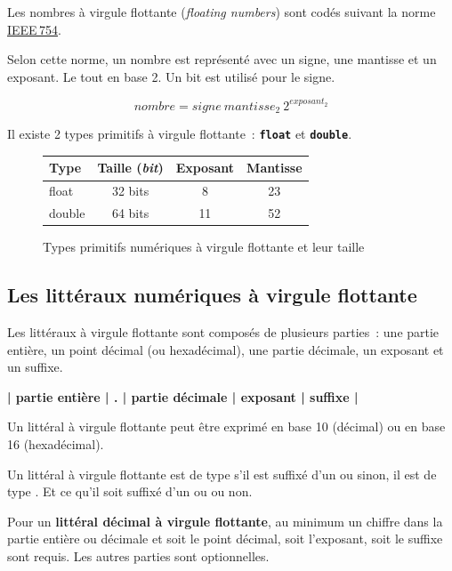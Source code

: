 Les nombres à virgule flottante (\textit{floating numbers}) sont codés suivant
la norme \href{https://fr.wikipedia.org/wiki/IEEE_754}{IEEE\,754}. 

Selon cette norme, un nombre est représenté avec un signe, une mantisse et un
exposant. Le tout en base 2. Un bit est utilisé pour le signe.  

\[
	nombre = signe~mantisse_2~2^{exposant_2} 
\]

Il existe 2 types primitifs à virgule flottante~: \textbf{\texttt{float}} et
\textbf{\texttt{double}}.

\begin{figure}[h]
	\centering
	\begin{tabular}[t]{|l|c|c|c|}
		\hline
		\rowcolor{black!40}
		\textbf{Type} 	& \textbf{Taille (\textit{bit})}	
								& \textbf{Exposant} & \textbf{Mantisse}\\
		\hline
		float	& 32 bits					& 8		& 23\\
		\hline
		double	& 64 bits					& 11	& 52\\
		\hline
	\end{tabular}
	\caption{Types primitifs numériques à virgule flottante et leur taille}
	\label{fig:typefloat}
\end{figure}



\subsection{Les littéraux numériques à virgule flottante}

Les littéraux à virgule flottante sont composés de plusieurs parties~: une
partie entière, un point décimal (ou hexadécimal), une partie décimale, un
exposant et un suffixe.

\bigskip
\begin{center}
	\large\bf	| partie entière | . | partie décimale | exposant | suffixe |
\end{center}
\bigskip

Un littéral à virgule flottante peut être exprimé en base 10 (décimal) ou en 
base 16 (hexadécimal). 

Un littéral à virgule flottante est de type  s'il est suffixé d'un
 ou  sinon, il est de type . Et ce qu'il soit suffixé
d'un  ou  ou non. 

Pour un \textbf{littéral décimal à virgule flottante}, au minimum un chiffre
dans la partie entière ou décimale et soit le point décimal, soit l'exposant,
soit le suffixe sont requis. Les autres parties sont optionnelles. 

